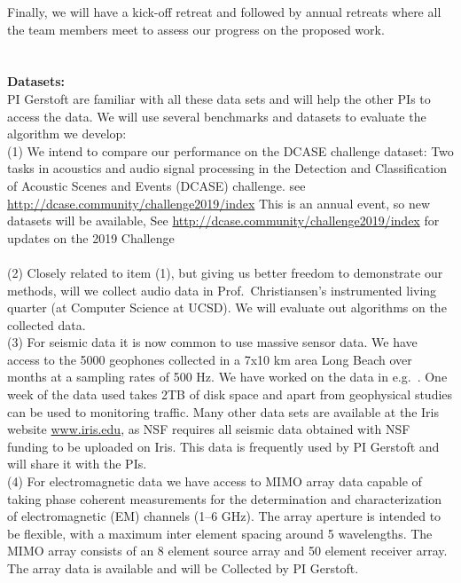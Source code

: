 \documentclass{article}
\begin{document}
Finally, we will have a kick-off retreat and followed by annual retreats where all the team members meet to assess our progress on the proposed work.
\\
\\
\\
{\bf Datasets:}\\
PI Gerstoft are familiar with all these data sets and will help the other PIs to access the data.
We will use several benchmarks and datasets to evaluate the algorithm we develop:\\
(1) We intend to compare our performance on the DCASE challenge dataset\cite{mesaros2017dcase}: Two tasks in acoustics and audio signal processing in the  Detection and Classification of Acoustic Scenes and Events (DCASE) challenge. see \href{http://dcase.community/challenge2019/index}{http://dcase.community/challenge2019/index}
This is an annual event, so new datasets will be available, See \href{http://dcase.community/challenge2019/index}{http://dcase.community/challenge2019/index} for updates on the 2019 Challenge
\\
\\
(2)
Closely related to item (1), but giving us better freedom to demonstrate our methods, will we collect audio data in Prof.\ Christiansen's instrumented living
quarter (at Computer Science at UCSD). We will evaluate out algorithms on the collected data.
\\
(3) For seismic data it is now common to use massive sensor data. We have access to the 5000 geophones collected in a 7x10 km area Long Beach over months at a sampling rates of 500 Hz. We have worked on the data in e.g.\ \cite{riahi2017}. One week of the data used takes 2TB of disk space and apart from geophysical studies can be used to monitoring traffic\cite{riahi2015}. Many other data sets are available at the Iris website \href{www.iris.edu}{www.iris.edu}, as NSF requires all seismic data obtained with NSF funding to be uploaded on Iris. This data is frequently used by PI Gerstoft and will share it with the PIs.
\\
(4) For electromagnetic data we have access to MIMO array data  capable of taking phase coherent measurements for the determination and characterization of electromagnetic (EM) channels (1--6 GHz). The array aperture is intended to be flexible, with a maximum inter element spacing around 5 wavelengths. The MIMO array consists of an 8 element source array and 50 element receiver array. The array data is available and will be Collected by PI Gerstoft.
\end{document}
